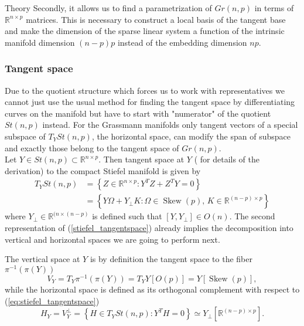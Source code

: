 \begin{chapter}{Theory}
Secondly, it allows us to find a parametrization of $Gr(n,p)$ in terms of $\mathbb{R}^{n\times p}$ matrices. This is necessary to construct a local basis of the tangent base
and make the dimension of the sparse linear system a function of the intrinsic manifold dimension $(n-p)p$ instead of the embedding dimension $np$.

\subsubsection{Tangent space} %
\label{ssub:Tangent space}
Due to the quotient structure which forces us to work with representatives we cannot just use the usual method for finding the tangent space by differentiating
curves on the manifold but have to start with "numerator" of the quotient $St(n,p)$ instead. For the Grassmann manifolds only tangent vectors of a special subspace of $T_YSt(n,p)$,
the horizontal space, can modify the span of subspace and exactly those belong to the tangent space of $Gr(n,p)$. \\

Let $Y\in St(n,p)\subset\mathbb{R}^{n\times p}$. Then tangent space at $Y$ (\cite{AbsilOptim} for details of the derivation) to the compact Stiefel manifold is given by
\begin{align}
    \label{eq:stiefel_tangentspace}
   T_YSt(n,p)	&= \left\lbrace Z\in\mathbb{R}^{n\times p}: Y^TZ+Z^TY=0 \right\rbrace\\
   &=  \left\lbrace Y\Omega + Y_{\bot}K: \Omega\in\operatorname{Skew}(p),\, K\in\mathbb{R}^{(n-p)\times p} \right\rbrace\nonumber
\end{align}
where $Y_{\bot}\in\mathbb{R}^{(n\times (n-p)}$ is defined such that $[Y,Y_{\bot}]\in O(n)$. The second representation of (\ref{stiefel_tangentspace})
already implies the decomposition into vertical and horizontal spaces we are going to perform next.

The vertical space at $Y$ is by definition the tangent space to the fiber $\pi^{-1}(\pi(Y))$
\begin{equation}
    \label{eq:stiefel_horizontalspace}
    V_Y = T_Y\pi^{-1}(\pi(Y))=T_YY[O(p)]=Y[\operatorname{Skew}(p)],
\end{equation}
while the horizontal space is defined as its orthogonal complement with respect to (\ref{eq:stiefel_tangentspace})
\begin{equation}
    \label{eq:stiefel_verticalspace}
    H_Y=V_Y^{\bot} =\left\lbrace H\in T_Y St(n,p):Y^TH=0 \right\rbrace \simeq Y_{\bot}[\mathbb{R}^{(n-p)\times p}].
\end{equation}


\end{chapter}
